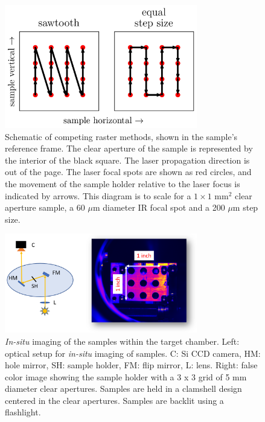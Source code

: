 \begin{figure}
	\centering
	\includegraphics[width=0.75\textwidth]{figures/chap3/Rastering_Methods.png}
	\caption{Schematic of competing raster methods, shown in the sample's reference frame. The clear aperture of the sample is represented by the interior of the black square. The laser propagation direction is out of the page. The laser focal spots are shown as red circles, and the movement of the sample holder relative to the laser focus is indicated by arrows. This diagram is to scale for a $1\times1$ mm$^2$ clear aperture sample, a 60 $\mu$m diameter IR focal spot and a 200 $\mu$m step size.}
	\label{fig:Rastering_Methods}
\end{figure}

\begin{figure}
	\centering
	\includegraphics[width=0.75\textwidth]{figures/chap3/sample_holder.png}
	\caption{\textit{In-situ} imaging of the samples within the target chamber. Left: optical setup for \textit{in-situ} imaging of samples. C: Si CCD camera, HM: hole mirror, SH: sample holder, FM: flip mirror, L: lens. Right: false color image showing the sample holder with a 3 x 3 grid of 5 mm diameter clear apertures. Samples are held in a clamshell design centered in the clear apertures. Samples are backlit using a flashlight.}
	\label{fig:sample_holder}
\end{figure}

